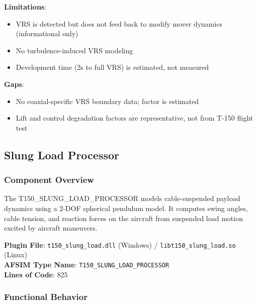 \unclass \textbf{Limitations}:
\begin{itemize}
	\item \unclass VRS is detected but does not feed back to modify mover dynamics (informational only)
	\item \unclass No turbulence-induced VRS modeling
	\item \unclass Development time (2s to full VRS) is estimated, not measured
\end{itemize}

\unclass \textbf{Gaps}:
\begin{itemize}
	\item \unclass No coaxial-specific VRS boundary data; factor is estimated
	\item \unclass Lift and control degradation factors are representative, not from T-150 flight test
\end{itemize}

\pagebreak


\subsection{\unclass Slung Load Processor}\label{sec:SlungLoadProcessor}

\subsubsection{\unclass Component Overview}\label{sec:SlungLoadOverview}

\unclass The T150\_SLUNG\_LOAD\_PROCESSOR models cable-suspended payload dynamics using a 2-DOF spherical pendulum model. It computes swing angles, cable tension, and reaction forces on the aircraft from suspended load motion excited by aircraft maneuvers.

\unclass \textbf{Plugin File}: \texttt{t150\_slung\_load.dll} (Windows) / \texttt{libt150\_slung\_load.so} (Linux)\\
\textbf{AFSIM Type Name}: \texttt{T150\_SLUNG\_LOAD\_PROCESSOR}\\
\textbf{Lines of Code}: 825

\subsubsection{\unclass Functional Behavior}\label{sec:SlungLoadFunctionalBehavior}


